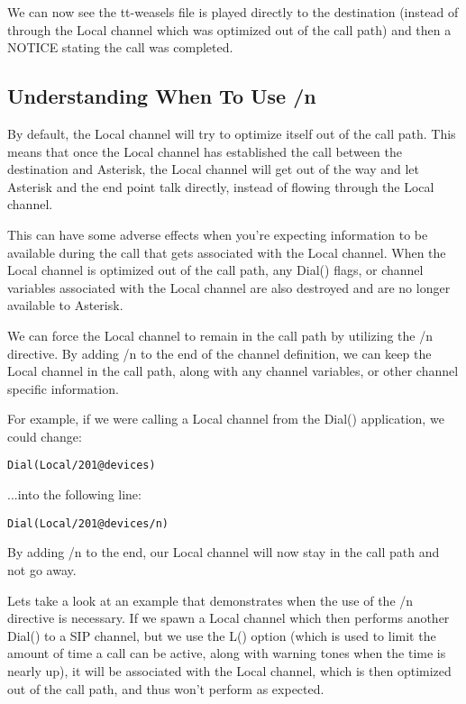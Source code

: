 We can now see the tt-weasels file is played directly to the destination
(instead of through the Local channel which was optimized out of the call path)
and then a NOTICE stating the call was completed.

\subsection{Understanding When To Use /n}

By default, the Local channel will try to optimize itself out of the call path.
This means that once the Local channel has established the call between the
destination and Asterisk, the Local channel will get out of the way and let
Asterisk and the end point talk directly, instead of flowing through the Local
channel.

This can have some adverse effects when you're expecting information to be
available during the call that gets associated with the Local channel. When the
Local channel is optimized out of the call path, any Dial() flags, or channel
variables associated with the Local channel are also destroyed and are no longer
available to Asterisk.

We can force the Local channel to remain in the call path by utilizing the /n
directive. By adding /n to the end of the channel definition, we can keep the
Local channel in the call path, along with any channel variables, or other
channel specific information.

For example, if we were calling a Local channel from the Dial() application, we
could change:

\begin{verbatim}
Dial(Local/201@devices)
\end{verbatim}

...into the following line:

\begin{verbatim}
Dial(Local/201@devices/n)
\end{verbatim}

By adding /n to the end, our Local channel will now stay in the call path and
not go away.

Lets take a look at an example that demonstrates when the use of the /n 
directive is necessary. If we spawn a Local channel which then performs another
Dial() to a SIP channel, but we use the L() option (which is used to limit the
amount of time a call can be active, along with warning tones when the time is
nearly up), it will be associated with the Local channel, which is then
optimized out of the call path, and thus won't perform as expected.

